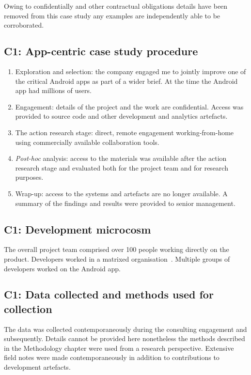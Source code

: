Owing to confidentially and other contractual obligations details have been removed from this case study any examples are independently able to be corroborated. 


\subsection{C1: App-centric case study procedure}
{\small
\begin{enumerate}
    \itemsep0em
    \item Exploration and selection: the company engaged me to jointly improve one of the critical Android apps as part of a wider brief. At the time the Android app had millions of users.
    \item Engagement: details of the project and the work are confidential. Access was provided to source code and other development and analytics artefacts.
    \item The action research stage: direct, remote engagement working-from-home using commercially available collaboration tools.
    \item \textit{Post-hoc} analysis: access to the materials was available after the action research stage and evaluated both for the project team and for research purposes.
    \item Wrap-up: access to the systems and artefacts are no longer available. A summary of the findings and results were provided to senior management.
\end{enumerate}
}


\subsection{C1: Development microcosm}
The overall project team comprised over 100 people working directly on the product. Developers worked in a matrixed organisation~. Multiple groups of developers worked on the Android app. 

\subsection{C1: Data collected and methods used for collection}
The data was collected contemporaneously during the consulting engagement and subsequently. Details cannot be provided here nonetheless the methods described in the Methodology chapter were used from a research perspective. Extensive field notes were made contemporaneously in addition to contributions to development artefacts. 

